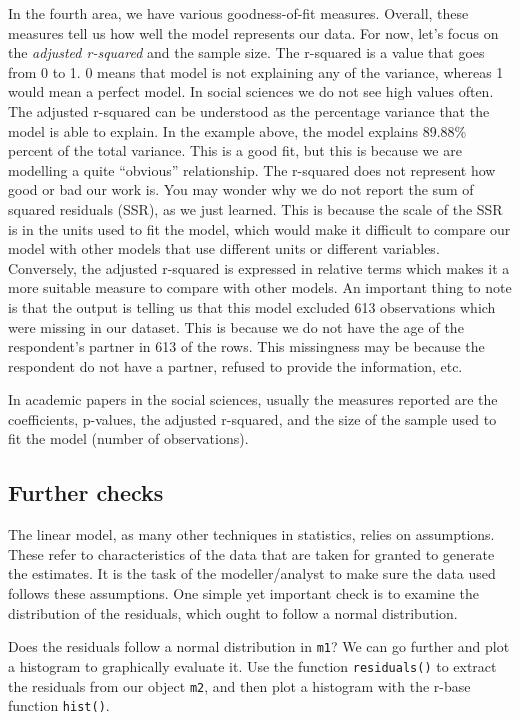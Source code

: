 \documentclass[
]{book}
\begin{document}
In the fourth area, we have various goodness-of-fit measures. Overall, these measures tell us how well the model represents our data. For now, let's focus on the \emph{adjusted r-squared} and the sample size. The r-squared is a value that goes from 0 to 1. 0 means that model is not explaining any of the variance, whereas 1 would mean a perfect model. In social sciences we do not see high values often. The adjusted r-squared can be understood as the percentage variance that the model is able to explain. In the example above, the model explains 89.88\% percent of the total variance. This is a good fit, but this is because we are modelling a quite ``obvious'' relationship. The r-squared does not represent how good or bad our work is. You may wonder why we do not report the sum of squared residuals (SSR), as we just learned. This is because the scale of the SSR is in the units used to fit the model, which would make it difficult to compare our model with other models that use different units or different variables. Conversely, the adjusted r-squared is expressed in relative terms which makes it a more suitable measure to compare with other models. An important thing to note is that the output is telling us that this model excluded 613 observations which were missing in our dataset. This is because we do not have the age of the respondent's partner in 613 of the rows. This missingness may be because the respondent do not have a partner, refused to provide the information, etc.

In academic papers in the social sciences, usually the measures reported are the coefficients, p-values, the adjusted r-squared, and the size of the sample used to fit the model (number of observations).

\hypertarget{further-checks}{%
\subsection{Further checks}\label{further-checks}}

The linear model, as many other techniques in statistics, relies on assumptions. These refer to characteristics of the data that are taken for granted to generate the estimates. It is the task of the modeller/analyst to make sure the data used follows these assumptions. One simple yet important check is to examine the distribution of the residuals, which ought to follow a normal distribution.

Does the residuals follow a normal distribution in \texttt{m1}? We can go further and plot a histogram to graphically evaluate it. Use the function \texttt{residuals()} to extract the residuals from our object \texttt{m2}, and then plot a histogram with the r-base function \texttt{hist()}.
\end{document}
